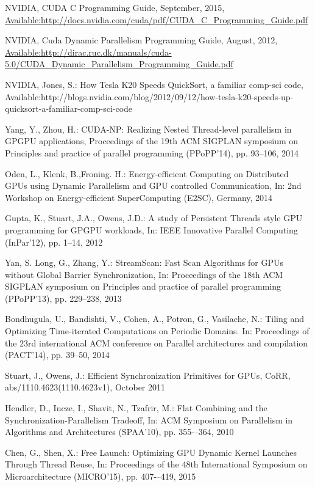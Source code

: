 \documentclass[conference]{IEEEtran}
\begin{document}
\begin{thebibliography}{4}
	 NVIDIA, CUDA C Programming Guide, September, 2015, \url{Available:http://docs.nvidia.com/cuda/pdf/CUDA_C_Programming_Guide.pdf}
	
	 NVIDIA, Cuda Dynamic Parallelism Programming Guide, August, 2012, \url{Available:http://dirac.ruc.dk/manuals/cuda-5.0/CUDA_Dynamic_Parallelism_Programming_Guide.pdf} 
	
	 NVIDIA, Jones, S.: How Tesla K20 Speeds QuickSort, a familiar
	comp-sci code, Available:http://blogs.nvidia.com/blog/2012/09/12/how-tesla-k20-speeds-up-quicksort-a-familiar-comp-sci-code
	
	 Yang, Y., Zhou, H.: CUDA-NP: Realizing Nested Thread-level
	parallelism in GPGPU applications, Proceedings of the 19th ACM SIGPLAN
	symposium on Principles and practice of parallel programming
	(PPoPP’14), pp. 93--106, 2014
	
	 Oden, L., Klenk, B.,Froning. H.: Energy-efficient
	Computing on Distributed GPUs using Dynamic Parallelism and GPU controlled
	Communication, In: 2nd Workshop on Energy-efficient SuperComputing (E2SC), Germany, 2014
	
	 Gupta, K., Stuart, J.A., Owens, J.D.: A study of Persistent Threads style GPU programming for GPGPU workloads,
	In: IEEE Innovative Parallel Computing (InPar'12), pp. 1--14, 2012
	
	 Yan, S. Long, G., Zhang, Y.: StreamScan: Fast Scan Algorithms for GPUs without Global Barrier Synchronization,
	In: Proceedings of the 18th ACM SIGPLAN symposium on Principles and practice of parallel programming (PPoPP'13), pp. 229--238, 2013
	
	 Bondhugula, U., Bandishti, V., Cohen, A., Potron, G., Vasilache, N.: Tiling and Optimizing Time-iterated Computations on Periodic Domains. In: Proceedings of the 23rd international ACM conference on Parallel architectures and compilation (PACT'14), pp. 39--50, 2014
	
	 Stuart, J., Owens, J.: Efficient Synchronization Primitives for GPUs, CoRR, abs/1110.4623(1110.4623v1), October 2011
	
	 Hendler, D., Incze, I., Shavit, N., Tzafrir, M.: Flat Combining and the Synchronization-Parallelism Tradeoff, In: ACM Symposium on Parallelism in Algorithms and Architectures (SPAA'10), pp. 355-–364, 2010
	
	 Chen, G., Shen, X.: Free Launch: Optimizing GPU Dynamic Kernel Launches Through Thread Reuse, In: Proceedings of the 48th International Symposium on Microarchitecture (MICRO'15), pp. 407-–419, 2015
	

\end{thebibliography}
\end{document}
